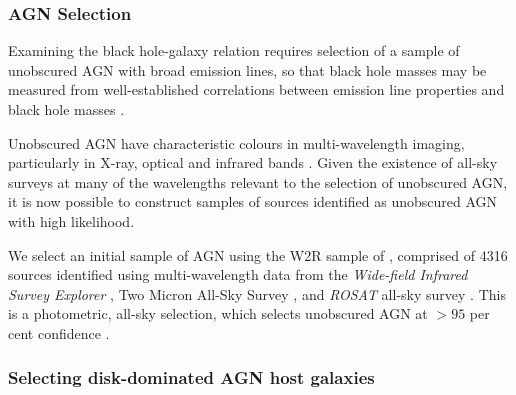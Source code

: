 \subsubsection{AGN Selection}

Examining the black hole-galaxy relation requires selection of a sample of unobscured AGN with broad emission lines, so that black hole masses may be measured from well-established correlations between emission line properties and black hole masses {\notebsm \citep[e.g.,][]{jiang11a,xiao11}}. 

Unobscured AGN have characteristic colours in multi-wavelength imaging, particularly in X-ray, optical and infrared bands \citep{sdss_qso_color_selection,xray_agn_selection,ir_agn_selection}. Given the existence of all-sky surveys at many of the wavelengths relevant to the selection of unobscured AGN, it is now possible to construct samples of sources identified as unobscured AGN with high likelihood.

We select an initial sample of AGN using the W2R sample of \citet{edelson12}, comprised of 4316 sources identified using multi-wavelength data from the \emph{Wide-field Infrared Survey Explorer} \citep[\emph{WISE};][]{wright10}, Two Micron All-Sky Survey \citep[2MASS;][]{skrutskie06}, and \emph{ROSAT} all-sky survey \citep[RASS;][]{voges99}. This is a photometric, all-sky selection, which selects unobscured AGN at $>95$ per cent confidence \citet{edelson12}.



\subsubsection{Selecting disk-dominated AGN host galaxies}



